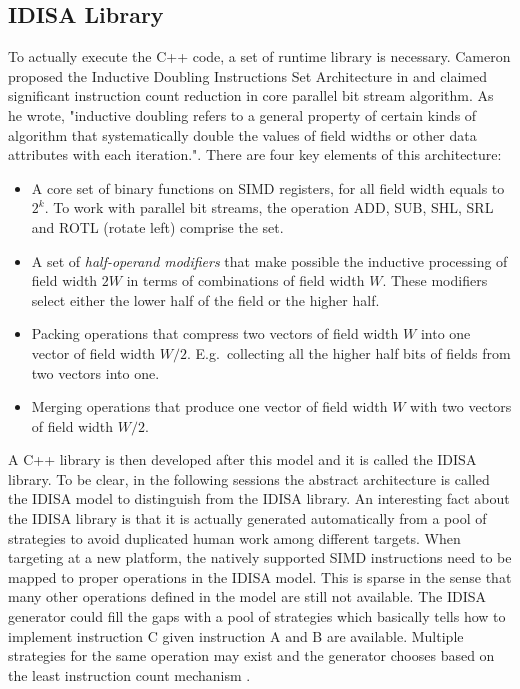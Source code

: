 \subsection{IDISA Library}
To actually execute the C++ code, a set of runtime library is necessary. Cameron proposed the Inductive Doubling Instructions Set Architecture in \cite{inductive_doubling_principle} and claimed significant instruction count reduction in core parallel bit stream algorithm. As he wrote, "inductive doubling refers to a general property of certain kinds of algorithm that systematically double the values of field widths or other data attributes with each iteration."\cite{inductive_doubling_principle}. There are four key elements of this architecture:
\begin{itemize}
    \item A core set of binary functions on SIMD registers, for all field width equals to $2^k$. To work with parallel bit streams, the operation ADD, SUB, SHL, SRL and ROTL (rotate left) comprise the set.
    \item A set of \textit{half-operand modifiers} that make possible the inductive processing of field width $2W$ in terms of combinations of field width $W$. These modifiers select either the lower half of the field or the higher half.
    \item Packing operations that compress two vectors of field width $W$ into one vector of field width $W/2$. E.g.\ collecting all the higher half bits of fields from two vectors into one.
    \item Merging operations that produce one vector of field width $W$ with two vectors of field width $W/2$.
\end{itemize}

A C++ library is then developed after this model and it is called the IDISA library. To be clear, in the following sessions the abstract architecture is called the IDISA model to distinguish from the IDISA library. An interesting fact about the IDISA library is that it is actually generated automatically from a pool of strategies to avoid duplicated human work among different targets. When targeting at a new platform, the natively supported SIMD instructions need to be mapped to proper operations in the IDISA model. This is sparse in the sense that many other operations defined in the model are still not available. The IDISA generator could fill the gaps with a pool of strategies which basically tells how to implement instruction C given instruction A and B are available. Multiple strategies for the same operation may exist and the generator chooses based on the least instruction count mechanism \cite{hua_idisa}.


